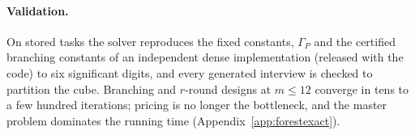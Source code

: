 \paragraph{Validation.}
On stored tasks the solver reproduces the fixed constants, $\Gamma_P$ and the certified branching constants of an independent dense implementation (released with the code) to six significant digits, and every generated interview is checked to partition the cube. Branching and $r$-round designs at $m\le12$ converge in tens to a few hundred iterations; pricing is no longer the bottleneck, and the master problem dominates the running time (Appendix~\ref{app:forestexact}).
